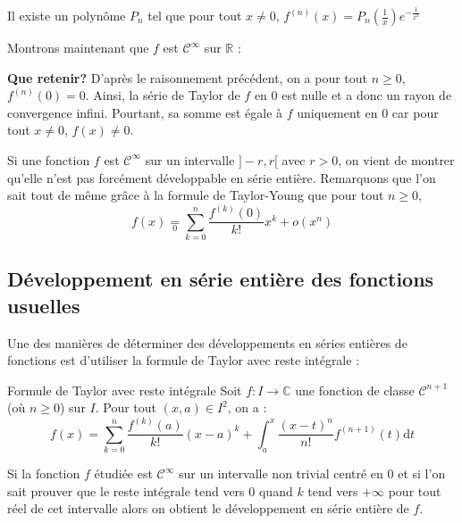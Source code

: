 \documentclass[french,11pt,twoside]{VcCours}
\newcommand{\dt}{\text{d}t}
\begin{document}
\begin{center}
\og Il existe un polynôme $P_n$ tel que pour tout $x \neq 0$, $f^{(n)}(x) = P_n \left(\frac{1}{x} \right) e^{- \frac{1}{x^2}}$ \fg
\end{center}

\newpage

\phantom{test}

\vspace{7cm}

Montrons maintenant que $f$ est $\mathcal{C}^{\infty}$ sur $\mathbb{R}$ :

\vspace{7cm}

\textbf{Que retenir?} D'après le raisonnement précédent, on a pour tout $n \geq 0$, $f^{(n)}(0)=0$. Ainsi, la série de Taylor de $f$ en $0$ est nulle et a donc un rayon de convergence infini. Pourtant, sa somme est égale à $f$ uniquement en $0$ car pour tout $x \neq 0$, $f(x) \neq 0$.

\begin{Remarque}{} Si une fonction $f$ est $\mathcal{C}^{\infty}$ sur un intervalle $]-r,r[$ avec $r>0$, on vient de montrer qu'elle n'est pas forcément développable en série entière. Remarquons que l'on sait tout de même grâce à la formule de Taylor-Young que pour tout $n \geq 0$,
$$ f(x) \underset{0}{=} \sum_{k=0}^n \dfrac{f^{(k)}(0)}{k!}x^k + o(x^n)$$
\end{Remarque}
\subsection{Développement en série entière des fonctions usuelles}
Une des manières de déterminer des développements en séries entières de fonctions est d'utiliser la formule de Taylor avec reste intégrale :

\begin{Theoreme}{Formule de Taylor avec reste intégrale} Soit $f : I \rightarrow \mathbb{C}$ une fonction de classe $\mathcal{C}^{n+1}$ (où $n \geq 0$) sur $I$. Pour tout $(x,a) \in I^2$, on a :
$$ f(x) = \sum_{k=0}^n \frac{f^{(k)}(a)}{k!}(x-a)^k + \int_{a}^x \frac{(x-t)^n}{n!} f^{(n+1)}(t) \dt$$
\end{Theoreme}

Si la fonction $f$ étudiée est $\mathcal{C}^{\infty}$ sur un intervalle non trivial centré en $0$ et si l'on sait prouver que le reste intégrale tend vers $0$ quand $k$ tend vers $+ \infty$ pour tout réel de cet intervalle alors on obtient le développement en série entière de $f$.
\end{document}
